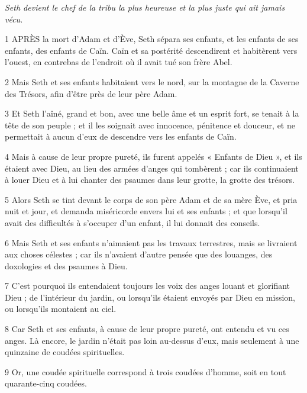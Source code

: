\par \textit{Seth devient le chef de la tribu la plus heureuse et la plus juste qui ait jamais vécu.}

\par 1 APRÈS la mort d'Adam et d'Ève, Seth sépara ses enfants, et les enfants de ses enfants, des enfants de Caïn. Caïn et sa postérité descendirent et habitèrent vers l'ouest, en contrebas de l'endroit où il avait tué son frère Abel.

\par 2 Mais Seth et ses enfants habitaient vers le nord, sur la montagne de la Caverne des Trésors, afin d'être près de leur père Adam.

\par 3 Et Seth l'aîné, grand et bon, avec une belle âme et un esprit fort, se tenait à la tête de son peuple ; et il les soignait avec innocence, pénitence et douceur, et ne permettait à aucun d'eux de descendre vers les enfants de Caïn.

\par 4 Mais à cause de leur propre pureté, ils furent appelés « Enfants de Dieu », et ils étaient avec Dieu, au lieu des armées d'anges qui tombèrent ; car ils continuaient à louer Dieu et à lui chanter des psaumes dans leur grotte, la grotte des trésors.

\par 5 Alors Seth se tint devant le corps de son père Adam et de sa mère Ève, et pria nuit et jour, et demanda miséricorde envers lui et ses enfants ; et que lorsqu'il avait des difficultés à s'occuper d'un enfant, il lui donnait des conseils.

\par 6 Mais Seth et ses enfants n'aimaient pas les travaux terrestres, mais se livraient aux choses célestes ; car ils n'avaient d'autre pensée que des louanges, des doxologies et des psaumes à Dieu.

\par 7 C'est pourquoi ils entendaient toujours les voix des anges louant et glorifiant Dieu ; de l'intérieur du jardin, ou lorsqu'ils étaient envoyés par Dieu en mission, ou lorsqu'ils montaient au ciel.

\par 8 Car Seth et ses enfants, à cause de leur propre pureté, ont entendu et vu ces anges. Là encore, le jardin n’était pas loin au-dessus d’eux, mais seulement à une quinzaine de coudées spirituelles.

\par 9 Or, une coudée spirituelle correspond à trois coudées d'homme, soit en tout quarante-cinq coudées.

